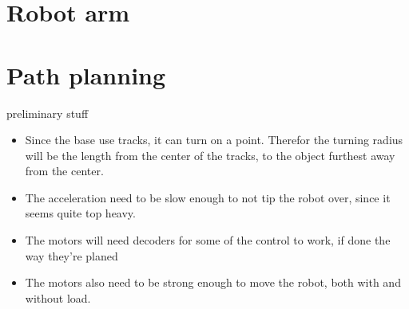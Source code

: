 \section*{Robot arm}
\section*{Path planning}
preliminary stuff
\begin{itemize}
    \item Since the base use tracks, it can turn on a point. Therefor the turning radius will be the length from the center of the tracks, to the object furthest away from the center.
    \item The acceleration need to be slow enough to not tip the robot over, since it seems quite top heavy.
    \item The motors will need decoders for some of the control to work, if done the way they're planed
    \item The motors also need to be strong enough to move the robot, both with and without load.
\end{itemize}